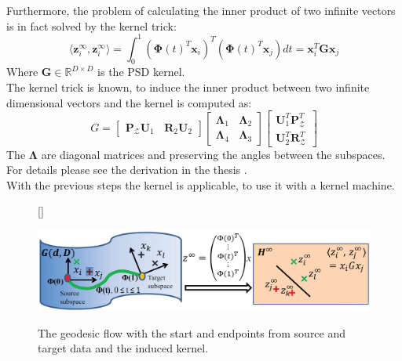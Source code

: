 Furthermore, the problem of calculating the inner product of two infinite vectors is in fact solved by the kernel trick:\cite{Gong.}
\begin{equation}
	\langle\mathbf{z}_i^\infty,\mathbf{z}_i^\infty\rangle = \int_{0}^{1}(\boldsymbol{\Phi}(t)^T\mathbf{x}_i)^T(\boldsymbol{\Phi}(t)^T\mathbf{x}_j)dt = \mathbf{x}_i^T\mathbf{G}\mathbf{x}_j
\end{equation}
Where $\mathbf{G} \in \mathbb{R}^{D\times D}$ is the \acs{PSD} kernel.\\ 
The kernel trick is known, to induce the inner product between two infinite dimensional vectors and the kernel is computed as:\cite{Gong.}
\begin{equation}
		G = \begin{bmatrix}	\mathbf{P}_\mathcal{Z} \mathbf{U}_1\>\>\>\>\mathbf{R}_2 \mathbf{U}_2\end{bmatrix}
		\begin{bmatrix}
			\boldsymbol{\Lambda}_1 \>\>\>\> \boldsymbol{\Lambda}_2\\
			\boldsymbol{\Lambda}_4 \>\>\>\> \boldsymbol{\Lambda}_3
		\end{bmatrix}
		\begin{bmatrix}
			\mathbf{U}_1^T\mathbf{P}_\mathcal{Z}^T\\
			\mathbf{U}_2^T\mathbf{R}_\mathcal{Z}^T
		\end{bmatrix}
\end{equation}
The $\boldsymbol{\Lambda}$ are diagonal matrices and preserving the angles between the subspaces.
For details please see the derivation in the thesis \cite[p. 45;110-113]{Gong.2015}.\\
With the previous steps the kernel is applicable, to use it with a kernel machine.\cite{Gong.}
\begin{figure}
	\centering
	[\FBwidth]
	{\caption[Summary of Geodesic Flow Kernel Approach]{The geodesic flow with the start and endpoints from source and target data and the induced kernel.}}
	{\includegraphics[width=\linewidth]{figures/GFKApproach.png}\label{FigGFKApproach}}
\end{figure}
